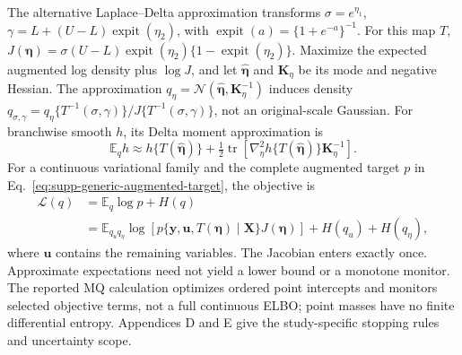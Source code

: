 \documentclass[12pt,letterpaper]{article}
\newcommand{\E}{\mathbb{E}}
\newcommand{\tr}{\operatorname{tr}}
\newcommand{\vect}[1]{\bm{#1}}
\newcommand{\mat}[1]{\bm{#1}}
\newcommand{\Normal}{\mathcal{N}}
\newcommand{\elbo}{\mathcal{L}}
\newcommand{\expit}{\operatorname{expit}}
\numberwithin{suppalgorithm}{section}
\numberwithin{equation}{section}
\numberwithin{table}{section}
\numberwithin{figure}{section}
\begin{document}
The alternative Laplace--Delta approximation
\citep{wang2013nonconjugatevb} transforms
\(\sigma=e^{\eta_1}\),
\(\gamma=L+(U-L)\expit(\eta_2)\), with
\(\expit(a)=\{1+e^{-a}\}^{-1}\). For this map \(T\),
\(J(\vect\eta)=\sigma(U-L)\expit(\eta_2)
\{1-\expit(\eta_2)\}\). Maximize the expected augmented log density
plus \(\log J\), and let \(\hat{\vect\eta}\) and \(\mat K_\eta\)
be its mode and negative Hessian. The approximation
\(q_\eta=\Normal(\hat{\vect\eta},\mat K_\eta^{-1})\) induces density
\(q_{\sigma,\gamma}=q_\eta\{T^{-1}(\sigma,\gamma)\}/
J\{T^{-1}(\sigma,\gamma)\}\), not an original-scale Gaussian. For
branchwise smooth \(h\), its Delta moment approximation is
\begin{equation}
\E_q h\approx h\{T(\hat{\vect\eta})\}
 +\tfrac12\tr\!\left[
 \nabla_\eta^2 h\{T(\hat{\vect\eta})\}\mat K_\eta^{-1}\right].
\label{eq:supp_generic_delta}
\end{equation}
For a continuous variational family and the complete augmented target
\(p\) in Eq.~\eqref{eq:supp-generic-augmented-target}, the objective is
\begin{equation}
\begin{aligned}
\elbo(q)&=\E_q\log p+H(q)\\
&=\E_{q_uq_\eta}\log[p\{\vect y,\vect u,T(\vect\eta)\mid\mat X\}
 J(\vect\eta)]+H(q_u)+H(q_\eta),
\end{aligned}
\label{eq:supp_generic_elbo}
\end{equation}
\label{eq:supp_elbo_transformed_coordinates}
where \(\vect u\) contains the remaining variables. The Jacobian enters
exactly once. Approximate expectations need not yield a lower bound or a
monotone monitor. The reported MQ calculation optimizes ordered point
intercepts and monitors selected objective terms, not a full continuous
ELBO; point masses have no finite differential entropy. Appendices D and E
give the study-specific stopping rules and uncertainty scope.
\end{document}
